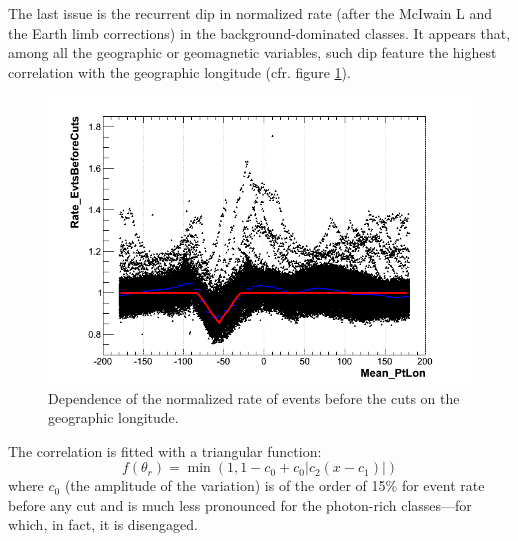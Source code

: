 \documentclass[a4paper,twocolumn]{article}
\begin{document}
The last issue is the recurrent dip in normalized rate (after the McIwain L and
the Earth limb corrections) in the background-dominated classes.
It appears that, among all the geographic or geomagnetic variables, such dip
feature the highest correlation with the geographic longitude
(cfr. figure \ref{EvtsBeforeCuts_lon}).
\begin{figure}[htb!]
  \begin{center}
    \includegraphics[width=\linewidth]{figures/EvtsBeforeCuts_lon}
    \caption{Dependence of the normalized rate of events before the cuts
      on the geographic longitude.}
    \label{EvtsBeforeCuts_lon}
  \end{center}
\end{figure}

The correlation is fitted with a triangular function:
\begin{equation}
  f(\theta_r) = \min\left(1, 1 - c_0 + c_0 |c_2 (x - c_1)|\right)
\end{equation}
where $c_0$ (the amplitude of the variation) is of the order of 15\% for
event rate before any cut and is much less pronounced for the photon-rich
classes---for which, in fact, it is disengaged.
\end{document}
